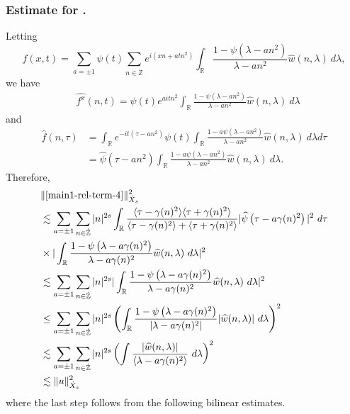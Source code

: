 \documentclass[12pt,reqno]{amsart}
\numberwithin{equation}{section}  %
\renewcommand{\cref}{\Cref}
\newcommand{\rr}{\mathbb{R}}
\newcommand{\zz}{\mathbb{Z}}
\newcommand{\zzdot}{\dot{\zz}}
\newcommand{\wh}{\widehat}
\begin{document}
\subsubsection{Estimate for \cref{main1-rel-term-4}.}
Letting $$f(x,t) = \sum_{a = \pm 1} \psi(t) \sum_{n \in \zzdot} e^{i\left( xn +
atn^{2} \right)}  
\int_\rr \frac{1 - \psi\left( \lambda - an^{2} \right)}{\lambda - an^{2}} 
\wh{w} \left( n, \lambda \right) \ d \lambda,$$ we have
\begin{equation*}
\begin{split}
& \wh{f^x}(n, t) = 
\psi(t) e^{aitn^{2}} \int_\rr
\frac{1 - \psi\left( \lambda - an^{2} \right)}{\lambda - an^{2}} 
\wh{w}(n, \lambda) \ d \lambda
\end{split}
\end{equation*}
and
\begin{equation*}
\begin{split}
\wh{f}\left( n, \tau \right)
& = \int_\rr e^{-it\left( \tau - an^{2} 
\right)} \psi(t) \int_\rr \frac{1 - a\psi\left( 
\lambda - an^{2} 
\right)}{\lambda - an^{2}} \wh{w}(n, \lambda) \ d \lambda d \tau
\\
& = \wh{\psi}\left( \tau - an^{2} \right) \int_\rr 
\frac{1 - a\psi\left( 
\lambda - an^{2} 
\right)}{\lambda - an^{2}} \wh{w}(n, \lambda) \ d \lambda.
\end{split}
\end{equation*}
Therefore,
\begin{equation}
\label{iu}
\begin{split}
& \| \cref{main1-rel-term-4} \|_{\dot{X}_{s}}^{2} 
\\
& \lesssim 
\sum_{a = \pm 1} \sum_{n \in \zzdot} |n|^{2s}
\int_\rr 
\frac{\langle \tau - \gamma(n)^{2} \rangle  \langle \tau + \gamma(n)^{2} \rangle }{\langle \tau - \gamma(n)^{2} \rangle  + \langle \tau + \gamma(n)^{2} \rangle }
| \wh{\psi}\left(
\tau - a\gamma(n)^{2} \right) |^2 \ d \tau 
\\
& \times |
\int_\rr \frac{1 - \psi\left( \lambda - a\gamma(n)^{2} \right)}{\lambda -
a\gamma(n)^{2}} \wh{w}(n, \lambda) \ d \lambda |^2  
\\
& \lesssim 
\sum_{a = \pm 1}\sum_{n \in \zzdot} |n|^{2s} | \int_\rr
\frac{1 - \psi\left( \lambda - a\gamma(n)^{2} \right)}{\lambda - a\gamma(n)^{2}}
\wh{w}(n, \lambda) \ d\lambda |^2 
\\
& \le  \sum_{a = \pm 1} \sum_{n \in \zzdot} |n|^{2s}  \left ( \int_\rr
\frac{1 - \psi\left( \lambda - a\gamma(n)^{2} \right)}{|\lambda - a\gamma(n)^{2}|}
|\wh{w}(n, \lambda) | \ d\lambda \right )^2
\\
& \lesssim \sum_{a = \pm 1} \sum_{n \in \zzdot} |n|^{2s}  \left ( \int
\frac{|\wh{w}(n, \lambda)|}{\langle \lambda - a\gamma(n)^{2} \rangle}
\ d\lambda \right )^2 
\\
& \lesssim \| u \|_{\dot{X}_{s}}^{2}
\end{split}
\end{equation}
where the last step follows from the following bilinear estimates.
\end{document}
